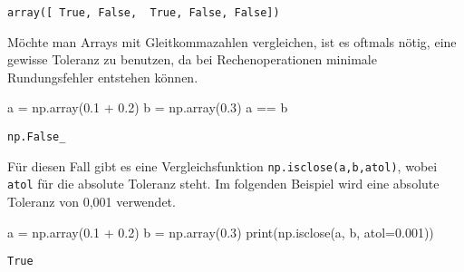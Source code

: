 \documentclass[
  letterpaper,
  DIV=11,
  numbers=noendperiod]{scrreprt}
\newenvironment{Shaded}{\begin{snugshade}}{\end{snugshade}}
\newcommand{\BuiltInTok}[1]{\textcolor[rgb]{0.00,0.23,0.31}{#1}}
\newcommand{\FloatTok}[1]{\textcolor[rgb]{0.68,0.00,0.00}{#1}}
\newcommand{\NormalTok}[1]{\textcolor[rgb]{0.00,0.23,0.31}{#1}}
\newcommand{\OperatorTok}[1]{\textcolor[rgb]{0.37,0.37,0.37}{#1}}
\begin{document}
\begin{tcolorbox}
\begin{verbatim}
array([ True, False,  True, False, False])
\end{verbatim}

Möchte man Arrays mit Gleitkommazahlen vergleichen, ist es oftmals
nötig, eine gewisse Toleranz zu benutzen, da bei Rechenoperationen
minimale Rundungsfehler entstehen können.

\begin{Shaded}
\begin{Highlighting}[]
\NormalTok{a }\OperatorTok{=}\NormalTok{ np.array(}\FloatTok{0.1} \OperatorTok{+} \FloatTok{0.2}\NormalTok{)}
\NormalTok{b }\OperatorTok{=}\NormalTok{ np.array(}\FloatTok{0.3}\NormalTok{)}
\NormalTok{a }\OperatorTok{==}\NormalTok{ b}
\end{Highlighting}
\end{Shaded}

\begin{verbatim}
np.False_
\end{verbatim}

Für diesen Fall gibt es eine Vergleichsfunktion
\texttt{np.isclose(a,b,atol)}, wobei \texttt{atol} für die absolute
Toleranz steht. Im folgenden Beispiel wird eine absolute Toleranz von
0,001 verwendet.

\begin{Shaded}
\begin{Highlighting}[]
\NormalTok{a }\OperatorTok{=}\NormalTok{ np.array(}\FloatTok{0.1} \OperatorTok{+} \FloatTok{0.2}\NormalTok{)}
\NormalTok{b }\OperatorTok{=}\NormalTok{ np.array(}\FloatTok{0.3}\NormalTok{)}
\BuiltInTok{print}\NormalTok{(np.isclose(a, b, atol}\OperatorTok{=}\FloatTok{0.001}\NormalTok{))}
\end{Highlighting}
\end{Shaded}

\begin{verbatim}
True
\end{verbatim}

\begin{tcolorbox}[enhanced jigsaw, breakable, opacityback=0, left=2mm, coltitle=black, leftrule=.75mm, colframe=quarto-callout-note-color-frame, opacitybacktitle=0.6, toprule=.15mm, bottomtitle=1mm, titlerule=0mm, toptitle=1mm, title=\textcolor{quarto-callout-note-color}{\faInfo}\hspace{0.5em}{Warum ist 0.1 + 0.2 nicht gleich 0.3?}, colbacktitle=quarto-callout-note-color!10!white, arc=.35mm, bottomrule=.15mm, rightrule=.15mm, colback=white]


\end{tcolorbox}
\end{tcolorbox}
\end{document}
